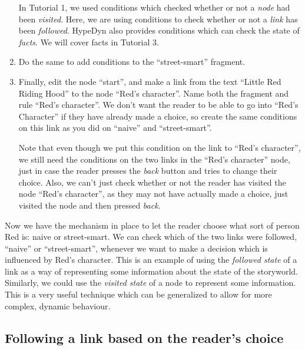 \documentclass{article}
\begin{document}
\begin{enumerate}
\noindent In Tutorial 1, we used conditions which checked whether or not a \textit{node} had been \textit{visited}. Here, we are using conditions to check whether or not a \textit{link} has been \textit{followed}. HypeDyn also provides conditions which can check the state of \textit{facts}. We will cover facts in Tutorial 3.

\item Do the same to add conditions to the ``street-smart'' fragment.

\item Finally, edit the node ``start'', and make a link from the text ``Little Red Riding Hood'' to the node ``Red's character''. Name both the fragment and rule ``Red's character''. We don't want the reader to be able to go into ``Red's Character'' if they have already made a choice, so create the same conditions on this link as you did on ``naive'' and ``street-smart''.

\noindent Note that even though we put this condition on the link to ``Red's character'', we still need the conditions on the two links in the ``Red's character'' node, just in case the reader presses the \textit{back} button and tries to change their choice. Also, we can't just check whether or not the reader has visited the node ``Red's character'', as they may not have actually made a choice, just visited the node and then pressed \textit{back}.
\end{enumerate}

Now we have the mechanism in place to let the reader choose what sort of person Red is: naive or street-smart. We can check which of the two links were followed, ``naive'' or ``street-smart'', whenever we want to make a decision which is influenced by Red's character. This is an example of using the \textit{followed state} of a link as a way of representing some information about the state of the storyworld. Similarly, we could use the \textit{visited state} of a node to represent some information. This is a very useful technique which can be generalized to allow for more complex, dynamic behaviour.


\subsection{Following a link based on the reader's choice}
\end{document}
